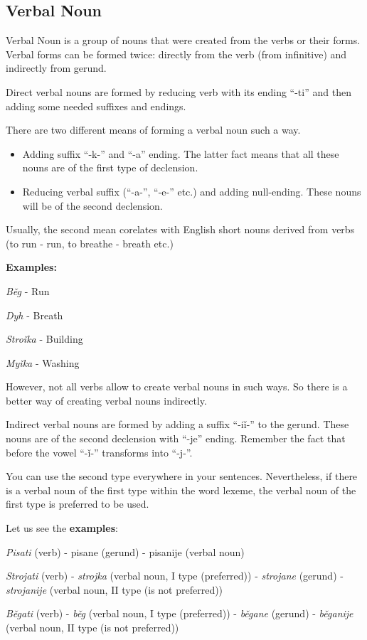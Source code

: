 \subsection{Verbal Noun}

Verbal Noun is a group of nouns that were created from the verbs or their forms. Verbal forms can be formed twice: directly from the verb (from infinitive) and indirectly from gerund.

Direct verbal nouns are formed by reducing verb with its ending “-ti” and then adding some needed suffixes and endings.

There are two different means of forming a verbal noun such a way.

\begin{itemize}
	\item Adding suffix “-k-” and “-a” ending. The latter fact means that all these nouns are of the first type of declension. 
	\item Reducing verbal suffix (“-a-”,  “-e-” etc.) and adding null-ending. These nouns will be of the second declension.
\end{itemize}

Usually, the second mean corelates with English short nouns derived from verbs (to run - run, to breathe - breath etc.)

\textbf{Examples:}

\textit{Běg} - Run

\textit{Dyh} - Breath

\textit{Stroǐka} - Building

\textit{Myǐka} - Washing

However, not all verbs allow to create verbal nouns in such ways. So there is a better way of creating verbal nouns indirectly.

Indirect verbal nouns are formed by adding a suffix “-iǐ-” to the gerund. These nouns are of the second declension with “-je” ending. Remember the fact that before the vowel “-ǐ-” transforms into “-j-”. 

You can use the second type everywhere in your sentences. Nevertheless, if there is a verbal noun of the first type within the word lexeme, the verbal noun of the first type is preferred to be used.

Let us see the \textbf{examples}:

\textit{Pisati} (verb) - pisane (gerund) - pisanije (verbal noun)

\textit{Strojati} (verb) - \textit{strojka} (verbal noun, I type (preferred)) - \textit{strojane} (gerund) - \textit{strojanije} (verbal noun, II type (is not preferred))

\textit{Běgati} (verb) - \textit{běg} (verbal noun, I type (preferred)) - \textit{běgane} (gerund) - \textit{běganije} (verbal noun, II type (is not preferred))  

